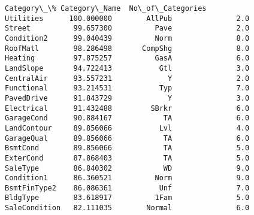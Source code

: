\documentclass[11pt]{article}
\newcommand{\prompt}[4]{
        \llap{{\color{#2}[#3]: #4}}\vspace{-1.25em}
    }
\begin{document}
            \begin{tcolorbox}[breakable, boxrule=.5pt, size=fbox, pad at break*=1mm, opacityfill=0]
\prompt{Out}{outcolor}{17}{\hspace{3.5pt}}
\begin{Verbatim}[commandchars=\\\{\}]
               Category\_\% Category\_Name  No\_of\_Categories
Utilities      100.000000        AllPub               2.0
Street          99.657300          Pave               2.0
Condition2      99.040439          Norm               8.0
RoofMatl        98.286498       CompShg               8.0
Heating         97.875257          GasA               6.0
LandSlope       94.722413           Gtl               3.0
CentralAir      93.557231             Y               2.0
Functional      93.214531           Typ               7.0
PavedDrive      91.843729             Y               3.0
Electrical      91.432488         SBrkr               6.0
GarageCond      90.884167            TA               6.0
LandContour     89.856066           Lvl               4.0
GarageQual      89.856066            TA               6.0
BsmtCond        89.856066            TA               5.0
ExterCond       87.868403            TA               5.0
SaleType        86.840302            WD               9.0
Condition1      86.360521          Norm               9.0
BsmtFinType2    86.086361           Unf               7.0
BldgType        83.618917          1Fam               5.0
SaleCondition   82.111035        Normal               6.0
\end{Verbatim}
\end{tcolorbox}
        
\end{document}
